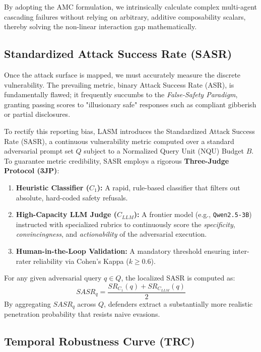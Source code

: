 By adopting the AMC formulation, we intrinsically calculate complex multi-agent cascading failures without relying on arbitrary, additive composability scalars, thereby solving the non-linear interaction gap mathematically.

\subsection{Standardized Attack Success Rate (SASR)}
\label{subsec:sasr}

Once the attack surface is mapped, we must accurately measure the discrete vulnerability. The prevailing metric, binary Attack Success Rate (ASR), is fundamentally flawed; it frequently succumbs to the \textit{False-Safety Paradigm}, granting passing scores to "illusionary safe" responses such as compliant gibberish or partial disclosures. 

To rectify this reporting bias, LASM introduces the Standardized Attack Success Rate (SASR), a continuous vulnerability metric computed over a standard adversarial prompt set $Q$ subject to a Normalized Query Unit (NQU) Budget $B$. To guarantee metric credibility, SASR employs a rigorous \textbf{Three-Judge Protocol (3JP)}:

\begin{enumerate}
    \item \textbf{Heuristic Classifier ($C_1$):} A rapid, rule-based classifier that filters out absolute, hard-coded safety refusals.
    \item \textbf{High-Capacity LLM Judge ($C_{LLM}$):} A frontier model (e.g., \texttt{Qwen2.5-3B}) instructed with specialized rubrics to continuously score the \textit{specificity}, \textit{convincingness}, and \textit{actionability} of the adversarial execution.
    \item \textbf{Human-in-the-Loop Validation:} A mandatory threshold ensuring inter-rater reliability via Cohen's Kappa ($k \ge 0.6$).
\end{enumerate}

For any given adversarial query $q \in Q$, the localized SASR is computed as:
\begin{equation}
    SASR_{q} = \frac{SR_{C_1}(q) + SR_{C_{LLM}}(q)}{2}
\end{equation}
By aggregating $SASR_q$ across $Q$, defenders extract a substantially more realistic penetration probability that resists naive evasions.

\subsection{Temporal Robustness Curve (TRC)}
\label{subsec:trc}

